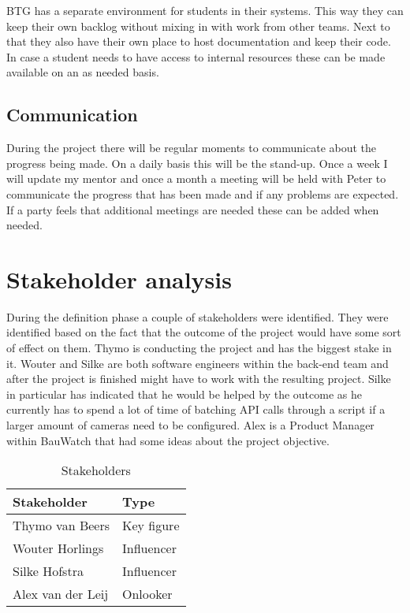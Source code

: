 \documentclass[11pt, a4paper]{article}
\begin{document}
BTG has a separate environment for students in their systems. This way they can keep their own backlog without mixing in with work from other teams. Next to that they also have their own place to host documentation and keep their code. In case a student needs to have access to internal resources these can be made available on an as needed basis.

\subsection{Communication}
During the project there will be regular moments to communicate about the progress being made. On a daily basis this will be the stand-up. Once a week I will update my mentor and once a month a meeting will be held with Peter to communicate the progress that has been made and if any problems are expected. If a party feels that additional meetings are needed these can be added when needed.
\newpage

\section{Stakeholder analysis}
During the definition phase a couple of stakeholders were identified. They were identified based on the fact that the outcome of the project would have
some sort of effect on them. Thymo is conducting the project and has the biggest stake in it. Wouter and Silke are both software engineers within the
back-end team and after the project is finished might have to work with the resulting project. Silke in particular has indicated that he would be helped
by the outcome as he currently has to spend a lot of time of batching API calls through a script if a larger amount of cameras need to be configured.
Alex is a Product Manager within BauWatch that had some ideas about the project objective.

\begin{table}[h]
    \centering
    \caption{Stakeholders}
    \label{tab:stakeholders}
    \begin{tabular}{ | m{10em} | m{10em} | }
    \hline
    \textbf{Stakeholder} & \textbf{Type} \\
    \hline
    Thymo van Beers & Key figure \\
    \hline
    Wouter Horlings & Influencer
    \\ \hline
    Silke Hofstra & Influencer
    \\ \hline
    Alex van der Leij & Onlooker
    \\ \hline
    \end{tabular}
\end{table}
\end{document}
